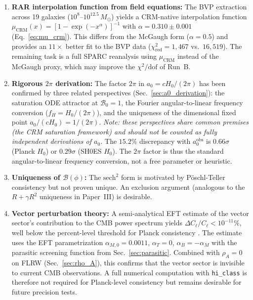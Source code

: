 \documentclass[aps,prd,twocolumn,superscriptaddress,nofootinbib]{revtex4-2}
\begin{document}
\begin{enumerate}
\item \textbf{RAR interpolation function from field equations:} The BVP extraction across 19 galaxies ($10^8$--$10^{12.5}\,M_\odot$) yields a CRM-native interpolation function $\mu_{\mathrm{CRM}}(x) = [1 - \exp(-x^\alpha)]^{-1}$ with $\alpha = 0.310 \pm 0.001$ (Eq.~\ref{eq:mu_crm}). This differs from the McGaugh form ($\alpha = 0.5$) and provides an $11\times$ better fit to the BVP data ($\chi^2_{\mathrm{red}} = 1{,}467$ vs.\ $16{,}519$). The remaining task is a full SPARC reanalysis using $\mu_{\mathrm{CRM}}$ instead of the McGaugh proxy, which may improve the $\chi^2/\mathrm{dof}$ of Run~B.

\item \textbf{Rigorous $2\pi$ derivation:} The factor $2\pi$ in $a_0 = cH_0/(2\pi)$ has been confirmed by three related perspectives (Sec.~\ref{sec:a0_derivation}): the saturation ODE attractor at $\mathcal{B}_0 = 1$, the Fourier angular-to-linear frequency conversion ($f_H = H_0/(2\pi)$), and the uniqueness of the dimensional fixed point $a_0/(cH_0) = 1/(2\pi)$. \textit{Note: these perspectives share common premises (the CRM saturation framework) and should not be counted as fully independent derivations of $a_0$.} The $15.2\%$ discrepancy with $a_0^{\mathrm{obs}}$ is $0.66\sigma$ (Planck $H_0$) or $0.29\sigma$ (SH0ES $H_0$). The $2\pi$ factor is thus the standard angular-to-linear frequency conversion, not a free parameter or heuristic.

\item \textbf{Uniqueness of $\mathcal{B}(\phi)$:} The $\mathrm{sech}^2$ form is motivated by P\"oschl-Teller consistency but not proven unique. An exclusion argument (analogous to the $R + \gamma R^2$ uniqueness in Paper~III) is desirable.

\item \textbf{Vector perturbation theory:} A semi-analytical EFT estimate of the vector sector's contribution to the CMB power spectrum yields $\Delta C_\ell / C_\ell < 10^{-11}\%$, well below the percent-level threshold for Planck consistency \cite{PlanckMG2016}. The estimate uses the EFT parametrization $\alpha_{M,0} = 0.0011$, $\alpha_T = 0$, $\alpha_B = -\alpha_M$ with the parasitic screening function from Sec.~\ref{sec:parasitic}. Combined with $\rho_A = 0$ on FLRW (Sec.~\ref{sec:rho_A}), this confirms that the vector sector is invisible to current CMB observations. A full numerical computation with \texttt{hi\_class} is therefore not required for Planck-level consistency but remains desirable for future precision tests.


\end{enumerate}
\end{document}
